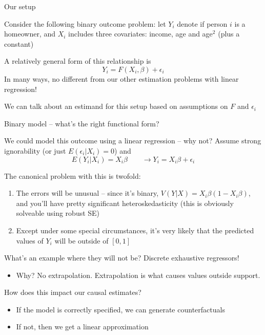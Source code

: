 \documentclass[notes,11pt, aspectratio=169]{beamer}
\newenvironment{wideitemize}{\itemize\addtolength{\itemsep}{10pt}}{\enditemize}
\begin{document}
\begin{frame}{Our setup}
  \begin{wideitemize}
  \item Consider the following binary outcome problem: let $Y_{i}$ denote if
    person $i$ is a homeowner, and $X_{i}$ includes three covariates:
    income, age and age$^{2}$ (plus a constant)
  \item A relatively general form of this relationship is 
    $$Y_{i} = F(X_{i},\beta) + \epsilon_{i}$$
    In many ways, no different from our other estimation
    problems with linear regression!
  \item We can talk about an estimand for this setup based on
    assumptions on $F$ and $\epsilon_{i}$
  \end{wideitemize}
\end{frame}

\begin{frame}{Binary model -- what's the right functional form?}
  \begin{wideitemize}
    
  \item We could model this outcome using a linear regression -- why
    not? Assume strong ignorability (or just
    $E(\epsilon_{i} | X_{i}) = 0$) and
    $$E(Y_{i}|X_{i}) = X_{i}\beta \qquad \rightarrow Y_{i} = X_{i}\beta + \epsilon_{i}$$
  \item  The canonical problem with this is twofold:
  \begin{enumerate}
  \item The errors will be unusual -- since it's binary,
    $V(Y|X) = X_{i}\beta (1- X_{i}\beta)$, and you'll have pretty
    significant heteroskedasticity (this is obviously solveable using robust SE)
  \item Except under some special circumstances, it's very likely that
    the predicted values of $Y_{i}$ will be outside of $[0,1]$
  \end{enumerate}
\item What's an example where they will not be? Discrete exhaustive regressors!
  \begin{itemize}
  \item   Why? No extrapolation. Extrapolation is what causes values outside support.
  \end{itemize}
\item How does this impact our causal estimates?
  \begin{itemize}
  \item If the model is correctly specified, we can generate
    counterfactuals
  \item If not, then we get a linear approximation
  \end{itemize}
  \end{wideitemize}
\end{frame}
\end{document}
